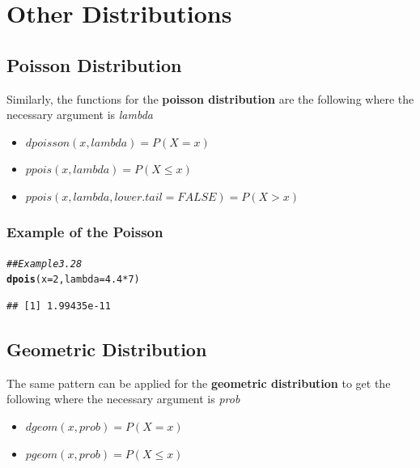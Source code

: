 \documentclass{report}\usepackage[]{graphicx}\usepackage[]{color}
\makeatletter
\newcommand{\hlnum}[1]{\textcolor[rgb]{0.686,0.059,0.569}{#1}}%
\newcommand{\hlcom}[1]{\textcolor[rgb]{0.678,0.584,0.686}{\textit{#1}}}%
\newcommand{\hlopt}[1]{\textcolor[rgb]{0,0,0}{#1}}%
\newcommand{\hlstd}[1]{\textcolor[rgb]{0.345,0.345,0.345}{#1}}%
\newcommand{\hlkwc}[1]{\textcolor[rgb]{0.333,0.667,0.333}{#1}}%
\newcommand{\hlkwd}[1]{\textcolor[rgb]{0.737,0.353,0.396}{\textbf{#1}}}%
\newenvironment{kframe}{%
 \def\at@end@of@kframe{}%
 \ifinner\ifhmode%
  \def\at@end@of@kframe{\end{minipage}}%
  \begin{minipage}{\columnwidth}%
 \fi\fi%
 \def\FrameCommand##1{\hskip\@totalleftmargin \hskip-\fboxsep
 \colorbox{shadecolor}{##1}\hskip-\fboxsep
     \hskip-\linewidth \hskip-\@totalleftmargin \hskip\columnwidth}%
 \MakeFramed {\advance\hsize-\width
   \@totalleftmargin\z@ \linewidth\hsize
   \@setminipage}}%
 {\par\unskip\endMakeFramed%
 \at@end@of@kframe}
\newenvironment{knitrout}{}{} %
\makeatother
\begin{document}
\section{Other Distributions}
\subsection{Poisson Distribution}
Similarly, the functions for the \textbf{poisson distribution} are the following where the necessary argument is \textit{lambda}
\begin{itemize} 
\item $dpoisson(x, lambda) = P(X = x)$ 
\item $ppois(x, lambda) = P(X \leq x)$ 
\item $ppois(x, lambda, lower.tail = FALSE) = P(X > x)$ 
\end{itemize}

\subsubsection{Example of the Poisson}

\begin{knitrout}
\color{fgcolor}\begin{kframe}
\begin{alltt}
\hlcom{## Example 3.28 }
\hlkwd{dpois}\hlstd{(}\hlkwc{x} \hlstd{=} \hlnum{2}\hlstd{,} \hlkwc{lambda} \hlstd{=} \hlnum{4.4}\hlopt{*}\hlnum{7}\hlstd{)}
\end{alltt}
\begin{verbatim}
## [1] 1.99435e-11
\end{verbatim}
\end{kframe}
\end{knitrout}



\subsection{Geometric Distribution}
The same pattern can be applied for the \textbf{geometric distribution} to get the following where the necessary argument is \textit{prob}
\begin{itemize} 
\item $dgeom(x,prob) = P(X = x)$ 
\item $pgeom(x,prob) = P(X \leq x)$
\end{itemize}
\end{document}
